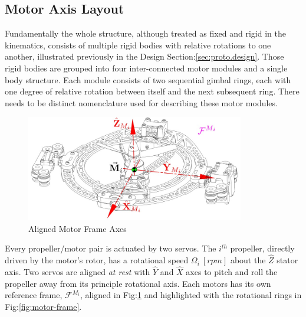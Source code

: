 \subsection{Motor Axis Layout}
\label{subsec:proto.conventions.motoraxis}
Fundamentally the whole structure, although treated as fixed and rigid in the kinematics, consists of multiple rigid bodies with relative rotations to one another, illustrated previously in the Design Section:\ref{sec:proto.design}. Those rigid bodies are grouped into four inter-connected motor modules and a single body structure. Each module consists of two sequential gimbal rings, each with one degree of relative rotation between itself and the next subsequent ring. There needs to be distinct nomenclature used for describing these motor modules. 
\begin{figure}[htbp]
\centering
\includegraphics[width=0.85\textwidth]{figs/motor-axes}
\caption{Aligned Motor Frame Axes}
\label{fig:motor-axes}
\end{figure}
\par
Every propeller/motor pair is actuated by two servos. The $i^{th}$ propeller, directly driven by the motor's rotor, has a rotational speed $\Omega_i~[rpm]$ about the $\hat{Z}$ stator axis. Two servos are aligned \emph{at rest} with $\hat{Y}$ and $\hat{X}$ axes to pitch and roll the propeller away from its principle rotational axis. Each motors has its own reference frame, $\mathcal{F}^{M_i}$, aligned in Fig:\ref{fig:motor-axes} and highlighted with the rotational rings in Fig:\ref{fig:motor-frame}.
\par
